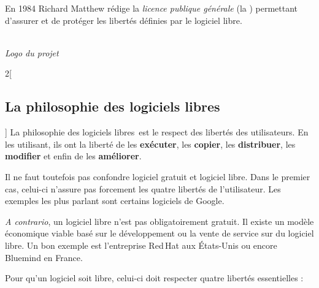 \newcommand{\lls}{logiciels libres~}


\begin{minipage}{0.7\textwidth}
En 1984 \textcolor{Cdl}{Richard Matthew } rédige la \textcolor{Cdl}{\textit{licence publique générale }} (la ) permettant d’assurer et de protéger les libertés définies par le logiciel libre. 
\end{minipage}
\begin{minipage}{0.3\textwidth}
\begin{center}
\\
\textit{Logo du projet }
\end{center}
\end{minipage}

\begin{multicols}{2}[\subsection{La philosophie des logiciels libres}]
La philosophie des \lls est le respect des libertés des utilisateurs. En les utilisant, ils ont la liberté de les \textbf{exécuter}, les \textbf{copier}, les \textbf{distribuer}, les \textbf{modifier} et enfin de les \textbf{améliorer}.

Il ne faut toutefois pas confondre logiciel gratuit et logiciel libre. Dans le premier cas, celui-ci n’assure pas forcement les quatre libertés de l’utilisateur. Les exemples les plus parlant sont certains logiciels de Google.

\textit{A contrario}, un  logiciel libre n’est pas obligatoirement gratuit. Il existe un modèle économique viable basé sur le développement ou la vente de service sur du logiciel libre. Un bon exemple est l’entreprise Red\,Hat aux États-Unis ou encore Bluemind en France.
\end{multicols}


Pour qu’un logiciel soit libre, celui-ci doit respecter quatre libertés essentielles :

